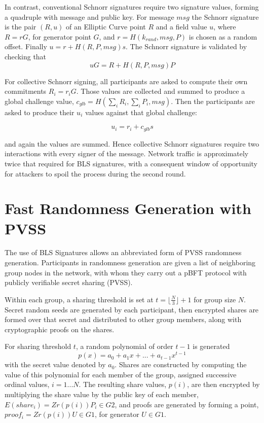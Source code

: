 \documentclass[article,oneside]{memoir}
\begin{document}
In contrast, conventional Schnorr signatures require two signature values, forming a quadruple with message and public key. For message $msg$ the Schnorr signature is the pair $(R,u)$ of an Elliptic Curve point $R$ and a field value $u$, where $R = r G$, for generator point $G$, and $r = H(k_{rand}, msg, P)$ is chosen as a random offset. Finally $u = r + H(R,P,msg) s$. The Schnorr signature is validated by checking that $$u G = R + H(R, P, msg) P$$

For collective Schnorr signing, all participants are asked to compute their own commitments $R_i = r_i G$. Those values are collected and summed to produce a global challenge value, $c_{glb} = H(\sum_i R_i, \sum_i P_i, msg)$.  Then the participants are asked to produce their $u_i$ values against that global challenge:

$$u_i = r_i + c_{glb} s$$

and again the values are summed. Hence collective Schnorr signatures require two interactions with every signer of the message. Network traffic is approximately twice that required for BLS signatures, with a consequent window of opportunity for attackers to spoil the process during the second round.

\chapter{Fast Randomness Generation with PVSS}

The use of BLS Signatures allows an abbreviated form of PVSS randomness generation. Participants in randomness generation are given a list of neighboring group nodes in the network, with whom they carry out a pBFT protocol with publicly verifiable secret sharing (PVSS). 

Within each group, a sharing threshold is set at $t = \lfloor \frac{N}{3} \rfloor + 1$ for group size $N$. Secret random seeds are generated by each participant, then encrypted shares are formed over that secret and distributed to other group members, along with cryptographic proofs on the shares.

For sharing threshold $t$, a random polynomial of order $t-1$ is generated $$p(x) = a_0 + a_1 x + ... + a_{t-1} x^{t-1}$$ with the secret value denoted by $a_0$.  Shares are constructed by computing the value of this polynomial for each member of the group, assigned successive ordinal values, $i = 1 ... N$. The resulting share values, $p(i)$, are then encrypted by multiplying the share value by the public key of each member, $E(share_i) = Zr(p(i)) P_i \in G2$, and proofs are generated by forming a point, $proof_i = Zr(p(i)) U \in G1$, for generator $U \in G1$. 
\end{document}
